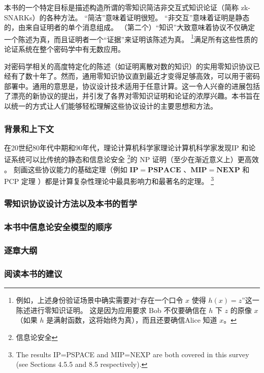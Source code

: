 本书的一个特定目标是描述构造所谓的零知识简洁非交互式知识论证（简称 zk-SNARKs）的各种方法。 “简洁”意味着证明很短。 “非交互”意味着证明是静态的，由来自证明者的单个消息组成。 （第二个）“知识”大致意味着协议不仅确定一个陈述为真，而且证明者一个“证据”来证明该陈述为真。 \footnote{例如，上述身份验证场景中确实需要对“存在一个口令 $x$ 使得 $h(x)=z$”这一陈述进行零知识证明。 这是因为应用要求 Bob 不仅要确信在 $h$ 下 $z$ 的原像 $x$（如果 $h$ 是满射函数，这将始终为真），而且还要确信Alice 知道 $x$。}满足所有这些性质的论证系统在整个密码学中有无数应用。

对密码学相关的高度特定化的陈述（如证明离散对数的知识\cite{Sch89}）的实用零知识协议已经有了数十年了。然而，通用零知识协议直到最近才变得足够高效，可以用于密码部署中。通用的意思是，协议设计技术适用于任意计算。这一令人兴奋的进展包括了漂亮的新协议的提出，并引发了各界对零知识证明和论证的浓厚兴趣。本书旨在以统一的方式让人们能够轻松理解这些协议设计的主要思想和方法。

\subsubsection{背景和上下文} 在20世纪80年代中期和90年代，理论计算机科学家理论计算机科学家发现IP 和论证系统可以比传统的静态和信息论安全 \footnote{信息论安全}的 NP 证明（至少在渐近意义上）更高效 。
刻画这些协议能力的基础定理（例如 $\mathbf{IP=PSPACE}$ \cite{LFKN92,Sha92}、$\mathbf{MIP=NEXP}$ \cite{BFL91} 和 PCP 定理 \cite{ALM+98,AS98}）都是计算复杂性理论中最具影响力和最著名的定理。 \footnote{The results IP=PSPACE and MIP=NEXP are both covered in this survey (see Sections 4.5.5 and 8.5 respectively).}




\subsubsection{零知识协议设计方法以及本书的哲学}  
\subsubsection{本书中信息论安全模型的顺序}
\subsubsection{逐章大纲}
\subsubsection{阅读本书的建议}



